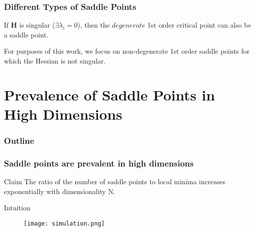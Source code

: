 \documentclass{beamer}
\begin{document}
\begin{frame}
\frametitle{Different Types of Saddle Points}
If $\bm{H}$ is singular ($\exists \lambda_i = 0$), then the $degenerate$ 1st order critical point can also be a saddle point.
\pause
\vspace{-13pt}
\begin{figure}
  \centering
    \hspace{4pt}
  \qquad
\end{figure}
\pause
For purposes of this work, we focus on non-degenerate 1st order saddle points for which the Hessian is not singular.
\end{frame}



\section{Prevalence of Saddle Points in High Dimensions}
\begin{frame}
\frametitle{Outline}
\tableofcontents[currentsection]
\end{frame}


\begin{frame}
\frametitle{Saddle points are prevalent in high dimensions}
\pause
\begin{block}{Claim}
The ratio of the number of saddle points to local minima increases exponentially with dimensionality N.
\end{block}
\pause
\begin{block}{Intuition}
\vspace{-8pt}
\begin{figure}
\centering
\texttt{[image: simulation.png]}
\end{figure}
\end{block}

\end{frame}
\end{document}
